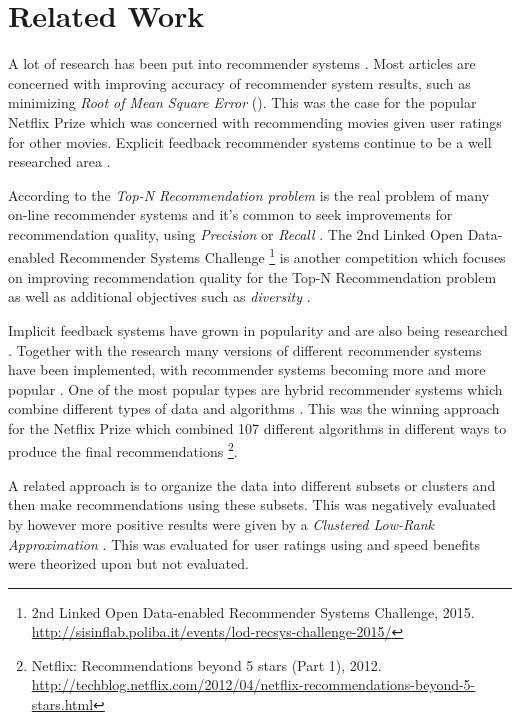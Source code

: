 \chapter{Related Work}\label{cha:relwork}


A lot of research has been put into recommender systems \citep{bobadilla2013recommender}. Most articles are concerned with improving accuracy of recommender system results, such as minimizing \textit{Root of Mean Square Error} (\rmse). This was the case for the popular Netflix Prize \citep{bennett2007netflix} which was concerned with recommending movies given user ratings for other movies. Explicit feedback recommender systems continue to be a well researched area \citep{bobadilla2013recommender}.

According to \citep{lai2012hybrid} the \textit{Top-N Recommendation problem} is the real problem of many on-line recommender systems and it's common to seek improvements for recommendation quality, using \textit{Precision} or \textit{Recall} \citep{bobadilla2013recommender}. The 2nd Linked Open Data-enabled Recommender Systems Challenge
\footnote{2nd Linked Open Data-enabled Recommender Systems Challenge, 2015. \url{http://sisinflab.poliba.it/events/lod-recsys-challenge-2015/}}
is another competition which focuses on improving recommendation quality for the Top-N Recommendation problem as well as additional objectives such as \textit{diversity} \citep{bobadilla2013recommender}.

Implicit feedback systems have grown in popularity and are also being researched \citep{hu2008collaborative, bobadilla2013recommender}. Together with the research many versions of different recommender systems have been implemented, with recommender systems becoming more and more popular \citep{bobadilla2013recommender}. One of the most popular types are hybrid recommender systems which combine different types of data and algorithms \citep{bobadilla2013recommender, lai2012hybrid}. This was the winning approach for the Netflix Prize which combined 107 different algorithms in different ways to produce the final recommendations
\footnote{ Netflix: Recommendations beyond 5 stars (Part 1), 2012. \url{http://techblog.netflix.com/2012/04/netflix-recommendations-beyond-5-stars.html} }.

A related approach is to organize the data into different subsets or clusters and then make recommendations using these subsets. This was negatively evaluated by \citep{cacheda2011comparison} however more positive results were given by a \textit{Clustered Low-Rank Approximation} \citep{niklas, savas2011clustered}.  This was evaluated for user ratings using \rmse and speed benefits were theorized upon but not evaluated.

